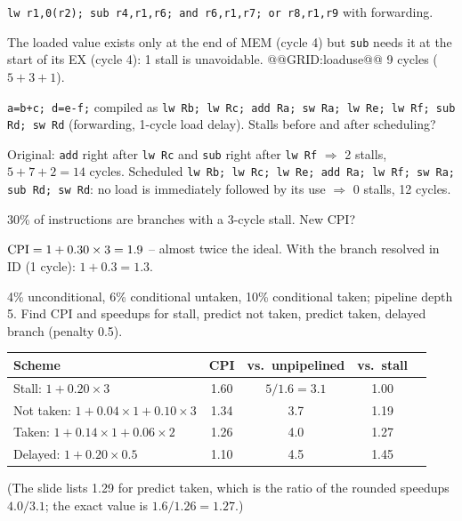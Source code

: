 \documentclass[11pt]{article}
\begin{document}
\begin{exercise}
\texttt{lw r1,0(r2); sub r4,r1,r6; and r6,r1,r7; or r8,r1,r9} with
forwarding.
\end{exercise}
\begin{solution}
The loaded value exists only at the end of MEM (cycle 4) but \texttt{sub}
needs it at the start of its EX (cycle 4): 1 stall is unavoidable.
@@GRID:loaduse@@
9 cycles ($5+3+1$).
\end{solution}

\begin{exercise}
\texttt{a=b+c; d=e-f;} compiled as \texttt{lw Rb; lw Rc; add Ra; sw Ra;
lw Re; lw Rf; sub Rd; sw Rd} (forwarding, 1-cycle load delay). Stalls
before and after scheduling?
\end{exercise}
\begin{solution}
Original: \texttt{add} right after \texttt{lw Rc} and \texttt{sub} right
after \texttt{lw Rf} $\Rightarrow$ 2 stalls, $5+7+2 = 14$ cycles.
Scheduled \texttt{lw Rb; lw Rc; lw Re; add Ra; lw Rf; sw Ra; sub Rd; sw Rd}:
no load is immediately followed by its use $\Rightarrow$ 0 stalls, 12
cycles.
\end{solution}

\begin{exercise}
30\% of instructions are branches with a 3-cycle stall. New CPI?
\end{exercise}
\begin{solution}
$\mathrm{CPI} = 1 + 0.30\times3 = 1.9$ -- almost twice the ideal. With the branch
resolved in ID (1 cycle): $1+0.3 = 1.3$.
\end{solution}

\begin{exercise}
4\% unconditional, 6\% conditional untaken, 10\% conditional taken;
pipeline depth 5. Find CPI and speedups for stall, predict not taken,
predict taken, delayed branch (penalty 0.5).
\end{exercise}
\begin{solution}
\begin{tabular}[t]{@{}lcccc@{}}
Scheme & CPI & vs.\ unpipelined & vs.\ stall \\
\hline
Stall: $1+0.20\times3$ & 1.60 & $5/1.6=3.1$ & 1.00 \\
Not taken: $1+0.04\times1+0.10\times3$ & 1.34 & 3.7 & 1.19 \\
Taken: $1+0.14\times1+0.06\times2$ & 1.26 & 4.0 & 1.27 \\
Delayed: $1+0.20\times0.5$ & 1.10 & 4.5 & 1.45 \\
\end{tabular}

(The slide lists 1.29 for predict taken, which is the ratio of the rounded
speedups $4.0/3.1$; the exact value is $1.6/1.26 = 1.27$.)
\end{solution}
\end{document}
